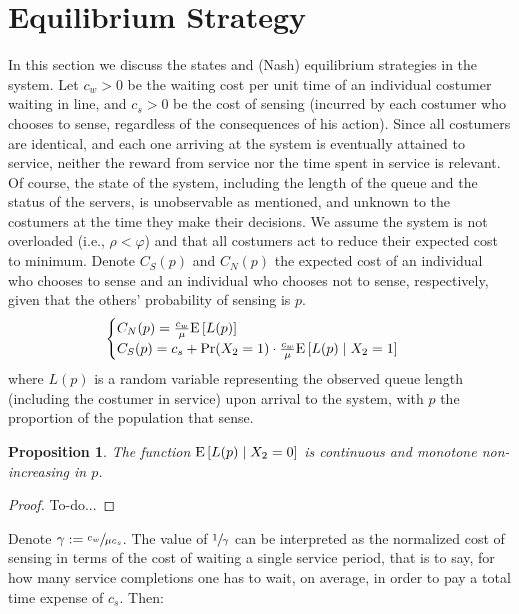 \documentclass[11pt]{article}
\numberwithin{equation}{section}
\newtheorem{proposition}{Proposition}[section]
\newcommand{\pr}{{\rm Pr}}
\newcommand{\e}{{\rm E}}
\begin{document}
\section{Equilibrium Strategy}
In this section we discuss the states and (Nash) equilibrium strategies in the system. Let $c_{w}>0$ be the waiting cost per unit time of an individual costumer waiting in line, and $c_{s}>0$ be the cost of sensing (incurred by each costumer who chooses to sense, regardless of the consequences of his action). Since all costumers are identical, and each one arriving at the system is eventually attained to service, neither the reward from service nor the time spent in service is relevant. Of course, the state of the system, including the length of the queue and the status of the servers, is unobservable as mentioned, and unknown to the costumers at the time they make their decisions. We assume the system is not overloaded (i.e., $\rho<\varphi$) and that all costumers act to reduce their expected cost to minimum. Denote $C_{S}(p)$ and $C_{N}(p)$ the expected cost of an individual who chooses to sense and an individual who chooses not to sense, respectively, given that the others' probability of sensing is $p$.
\begin{equation}\begin{cases}
 	C_{N}(p) = \frac{c_{w}}{\mu}\e\left[L(p)\right] \\
	C_{S}(p) = c_{s} + \pr(X_2=1) \cdot \frac{c_{w}}{\mu} \e\left[L(p)\mid X_{2}=1\right] 
\end{cases}
\label{LossFunc}
\end{equation}
where $L(p)$ is a random variable representing the observed queue length (including the costumer in service) upon arrival to the system, with $p$ the proportion of the population that sense. 

\begin{proposition}
The function $\e\left[L(p)\mid X_2=0\right]$ is continuous and monotone non-increasing in $p$. \label{MonotonicityProp}
\end{proposition}

\begin{proof}
To-do...
\end{proof}

Denote $\gamma :=\sfrac{c_{w}}{\mu c_{s}}$. The value of $\sfrac{1}{\gamma}$ can be interpreted as the normalized cost of sensing in terms of the cost of waiting a single service period, that is to say, for how many service completions one has to wait, on average, in order to pay a total time expense of $c_{s}$. Then:
\end{document}
